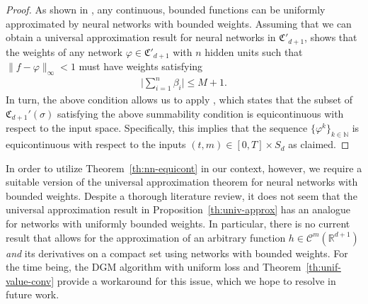 \documentclass[11pt,reqno]{amsart}
\numberwithin{equation}{section}
\theoremstyle{plain}
\newcommand{\R}{\mathbb{R}}
\newcommand{\sC}{\mathcal{C}}
\newcommand{\N}{\mathbb{N}}
\begin{document}
\begin{proof}
As shown in \cite{bdd-weights}, any continuous, bounded functions can be uniformly approximated by neural networks with bounded weights. Assuming that we can obtain a universal approximation result for neural networks in $\mathfrak{C}'_{d+1}$, \cite[Proposition 8]{equi-nn} shows that the weights of any network $\varphi \in \mathfrak{C}'_{d+1}$ with $n$ hidden units such that $\|f - \varphi\|_{\infty} < 1$ must have weights satisfying
\begin{align*}
    \Big|\sum_{i=1}^n \beta_i\Big| \leq M + 1.
\end{align*}
In turn, the above condition allows us to apply \cite[Theorem 20]{equi-nn}, which states that the subset of $\mathfrak{C}_{d+1}'(\sigma)$ satisfying the above summability condition is equicontinuous with respect to the input space. Specifically, this implies that the sequence $\{\varphi^k\}_{k \in \N}$ is equicontinuous with respect to the inputs $(t,m) \in [0,T] \times S_d$ as claimed.
\end{proof}
In order to utilize Theorem~\ref{th:nn-equicont} in our context, however, we require a suitable version of the universal approximation theorem for neural networks with bounded weights. Despite a thorough literature review, it does not seem that the universal approximation result in Proposition~\ref{th:univ-approx} has an analogue for networks with uniformly bounded weights. In particular, there is no current result that allows for the approximation of an arbitrary function $h \in \sC^{m}(\R^{d+1})$ \textit{and} its derivatives on a compact set using networks with bounded weights. For the time being, the DGM algorithm with uniform loss and Theorem~\ref{th:unif-value-conv} provide a workaround for this issue, which we hope to resolve in future work.
\end{document}
